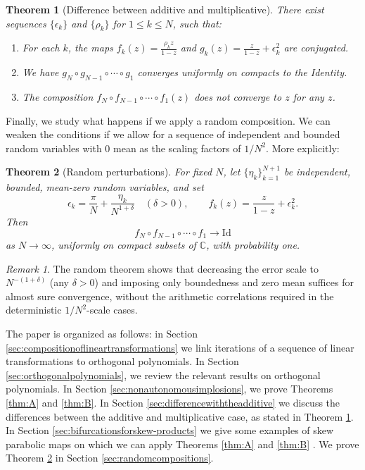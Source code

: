 \documentclass{amsart}
\newtheorem{mainthm}{Theorem}
\theoremstyle{remark}
\newtheorem*{remark}{Remark}
\theoremstyle{definition}
\begin{document}
\begin{mainthm}[Difference between additive and multiplicative]\label{thm:C}
There exist sequences $\{\epsilon_k\}$ and $\{\rho_k\}$ for $1\leq k\leq N$, such that:
\begin{enumerate}
\item For each $k$, the maps $\displaystyle{f_k(z)=\frac{\rho_k z}{1-z}}$ and $\displaystyle{g_k(z)=\frac{z}{1-z}+\epsilon_k^2}$ are conjugated.
\item We have $g_N \circ g_{N-1} \circ\cdots \circ g_1$ converges uniformly on compacts to the Identity.
\item The composition $f_N \circ f_{N-1}\circ\cdots \circ f_1(z)$ does not converge to $z$ for any $z$.
\end{enumerate}
\end{mainthm}

Finally, we study what happens if we apply a random composition. We can weaken the conditions if we allow for a sequence of independent and bounded random variables with $0$ mean as the scaling factors of $1/N^2$. More explicitly:

\begin{mainthm}[Random perturbations]\label{thm:random}
For fixed \(N\), let \(\{\eta_{k}\}_{k=1}^{N+1}\) be independent, bounded, mean-zero random variables, and set
\[
   \epsilon_{k} = \frac{\pi}{N}+\frac{\eta_{k}}{N^{1+\delta}}\quad (\delta>0), 
   \qquad
   f_k(z) = \frac{z}{1-z} + \epsilon_k^2 .
\]
Then
\[
   f_N\circ f_{N-1}\circ \cdots\circ f_1 \longrightarrow \mathrm{Id}
\]
as \(N\to\infty\), uniformly on compact subsets of $\mathbb{C}$, with probability one.
\end{mainthm}

\begin{remark}
The random theorem shows that decreasing the error scale to \(N^{-(1+\delta)}\) (any \(\delta>0\)) and imposing only boundedness and zero mean suffices for almost sure convergence, without the arithmetic correlations required in the deterministic \(1/N^2\)-scale cases.
\end{remark}

The paper is organized as follows: in Section \ref{sec:compositionoflineartransformations} we link iterations of a sequence of linear transformations to orthogonal polynomials. 
In Section \ref{sec:orthogonalpolynomials}, we review the relevant results on orthogonal polynomials.  
In Section \ref{sec:nonautonomousimplosions}, we prove Theorems \ref{thm:A} and \ref{thm:B}. 
In Section \ref{sec:differencewiththeadditive} we discuss the differences between the additive and multiplicative case, as stated in Theorem \ref{thm:C}. In Section \ref{sec:bifurcationsforskew-products} we give some examples of skew parabolic maps on which we can apply Theorems \ref{thm:A} and \ref{thm:B} . 
We prove Theorem \ref{thm:random} in Section \ref{sec:randomcompositions}. 
\end{document}
